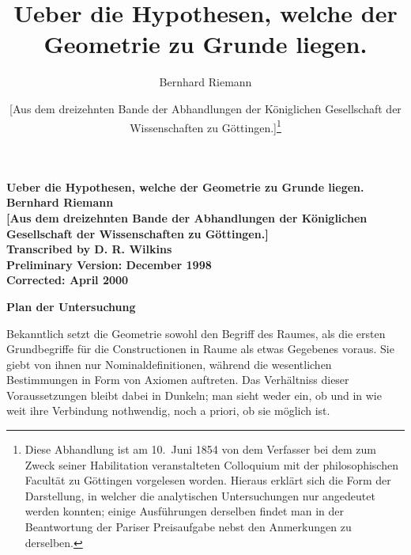 \documentclass[a4paper,12pt]{article}
\begin{document}
\thispagestyle{empty}
\begin{center}
\Large\bfseries
Ueber die Hypothesen, welche der Geometrie zu Grunde liegen.\\[12 pt]
Bernhard Riemann\\[12 pt]
[Aus dem dreizehnten Bande der Abhandlungen der K\"{o}niglichen
Gesellschaft der Wissenschaften zu G\"{o}ttingen.]\\[24 pt]
\large\mdseries
Transcribed by D. R. Wilkins\\[12 pt]
Preliminary Version: December 1998\\
Corrected: April 2000
\end{center}

\newpage
\setcounter{page}{1}


\title{Ueber die Hypothesen, welche der Geometrie zu Grunde liegen.}
\author{Bernhard Riemann}
\date{[Aus dem dreizehnten Bande der Abhandlungen der K\"{o}niglichen
Gesellschaft der Wissenschaften zu G\"{o}ttingen.]\thanks{Diese
Abhandlung ist am 10.~Juni 1854 von dem Verfasser bei dem zum Zweck
seiner Habilitation veranstalteten Colloquium mit der philosophischen
Facult\"{a}t zu G\"{o}ttingen vorgelesen worden.  Hieraus erkl\"{a}rt
sich die Form der Darstellung, in welcher die analytischen
Untersuchungen nur angedeutet werden konnten; einige Ausf\"{u}hrungen
derselben findet man in der Beantwortung der Pariser Preisaufgabe
nebst den Anmerkungen zu derselben.}}
\maketitle

\begin{center}
\large\bfseries
Plan der Untersuchung
\end{center}

Bekanntlich setzt die Geometrie sowohl den Begriff des Raumes,
als die ersten Grundbegriffe f\"{u}r die Constructionen in Raume
als etwas Gegebenes voraus.  Sie giebt von ihnen nur
Nominaldefinitionen, w\"{a}hrend die wesentlichen Bestimmungen in
Form von Axiomen auftreten.  Das Verh\"{a}ltniss dieser
Voraussetzungen bleibt dabei in Dunkeln; man sieht weder ein, ob
und in wie weit ihre Verbindung nothwendig, noch a priori, ob sie
m\"{o}glich ist.
\end{document}
